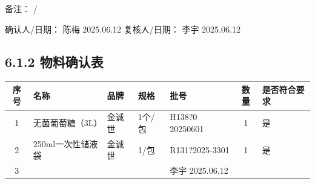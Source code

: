 \documentclass[UTF8,10pt,a4paper,fontset=fandol]{ctexart}
\newcommand{\fieldvalue}[1]{#1}
\newcommand{\handwritten}[1]{#1}
\begin{document}
备注：
\handwritten{/}

\noindent
确认人/日期：
\fieldvalue{\handwritten{陈梅}}
\quad
\fieldvalue{\handwritten{2025.06.12}}
\hfill
复核人/日期：
\fieldvalue{\handwritten{李宇}}
\quad
\fieldvalue{\handwritten{2025.06.12}}

\subsection*{6.1.2 物料确认表}

\begin{tabularx}{\textwidth}{|c|X|X|X|X|c|X|}
\hline
序号 & 名称 & 品牌 & 规格 & 批号 & 数量 & 是否符合要求 \\
\hline
1 &
\fieldvalue{无菌葡萄糖（3L）} &
\fieldvalue{\handwritten{金诚世}} &
\fieldvalue{1个/包} &
\fieldvalue{\handwritten{H138?0 20250601}} &
\fieldvalue{\handwritten{1}} &
\fieldvalue{\handwritten{是}} \\
\hline
2 &
\fieldvalue{\handwritten{250ml一次性储液袋}} &
\fieldvalue{\handwritten{金诚世}} &
\fieldvalue{\handwritten{1/包}} &
\fieldvalue{\handwritten{R131?2025-3301}} &
\fieldvalue{\handwritten{1}} &
\fieldvalue{\handwritten{是}} \\
\hline
3 & & & &
\fieldvalue{\handwritten{李宇 2025.06.12}} &
& \\
\hline
\end{tabularx}
\end{document}
